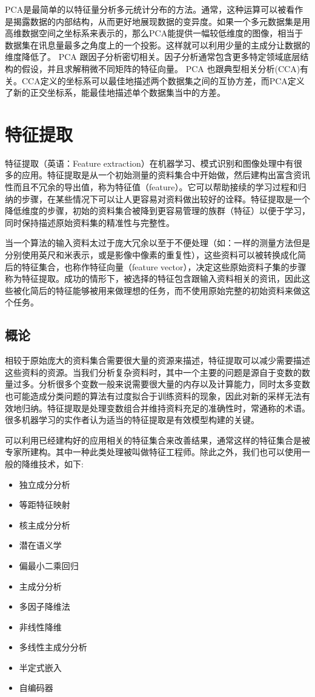 \documentclass{HEBUTMaster}   %
\begin{document}
PCA是最简单的以特征量分析多元统计分布的方法。通常，这种运算可以被看作是揭露数据的内部结构，从而更好地展现数据的变异度。如果一个多元数据集是用高维数据空间之坐标系来表示的，那么PCA能提供一幅较低维度的图像，相当于数据集在讯息量最多之角度上的一个投影。这样就可以利用少量的主成分让数据的维度降低了。
PCA 跟因子分析密切相关。因子分析通常包含更多特定领域底层结构的假设，并且求解稍微不同矩阵的特征向量。
PCA 也跟典型相关分析(CCA)有关。CCA定义的坐标系可以最佳地描述两个数据集之间的互协方差，而PCA定义了新的正交坐标系，能最佳地描述单个数据集当中的方差。

\chapter{特征提取}
特征提取（英语：Feature extraction）在机器学习、模式识别和图像处理中有很多的应用。特征提取是从一个初始测量的资料集合中开始做，然后建构出富含资讯性而且不冗余的导出值，称为特征值（feature）。它可以帮助接续的学习过程和归纳的步骤，在某些情况下可以让人更容易对资料做出较好的诠释。特征提取是一个降低维度的步骤，初始的资料集合被降到更容易管理的族群（特征）以便于学习，同时保持描述原始资料集的精准性与完整性。

当一个算法的输入资料太过于庞大冗余以至于不便处理（如：一样的测量方法但是分别使用英尺和米表示，或是影像中像素的重复性），这些资料可以被转换成化简后的特征集合，也称作特征向量（feature vector），决定这些原始资料子集的步骤称为特征提取。成功的情形下，被选择的特征包含跟输入资料相关的资讯，因此这些被化简后的特征能够被用来做理想的任务，而不使用原始完整的初始资料来做这个任务。

\section{概论}
相较于原始庞大的资料集合需要很大量的资源来描述，特征提取可以减少需要描述这些资料的资源。当我们分析复杂资料时，其中一个主要的问题是源自于变数的数量过多。分析很多个变数一般来说需要很大量的内存以及计算能力，同时太多变数也可能造成分类问题的算法有过度拟合于训练资料的现象，因此对新的采样无法有效地归纳。特征提取是处理变数组合并维持资料充足的准确性时，常通称的术语。很多机器学习的实作者认为适当的特征提取是有效模型构建的关键。

可以利用已经建构好的应用相关的特征集合来改善结果，通常这样的特征集合是被专家所建构。其中一种此类处理被叫做特征工程师。除此之外，我们也可以使用一般的降维技术，如下:
\begin{itemize}
  \item 独立成分分析
  \item 等距特征映射
  \item 核主成分分析
  \item 潜在语义学
  \item 偏最小二乘回归
  \item 主成分分析
  \item 多因子降维法
  \item 非线性降维
  \item 多线性主成分分析
  \item 半定式嵌入
  \item 自编码器
\end{itemize}
\end{document}
